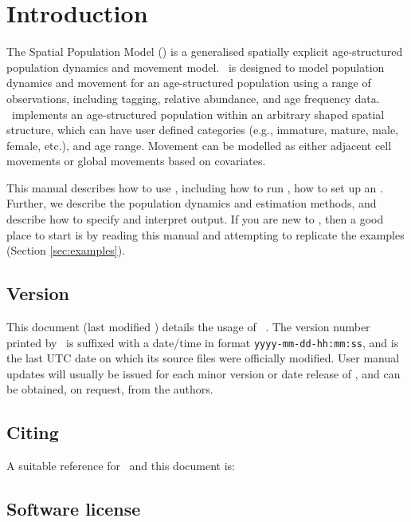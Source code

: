 \section{Introduction\label{sec:Introduction}}

The Spatial Population Model (\SPM) is a generalised spatially explicit age-structured population dynamics and movement model. \SPM\ is designed to model population dynamics and movement for an age-structured population using a range of observations, including tagging, relative abundance, and age frequency data. \SPM\ implements an age-structured population within an arbitrary shaped spatial structure, which can have user defined categories (e.g., immature, mature, male, female, etc.), and age range. Movement can be modelled as either adjacent cell movements or global movements based on covariates.

This manual describes how to use \SPM, including how to run \SPM, how to set up an \config. Further, we describe the population dynamics and estimation methods, and describe how to specify and interpret output. If you are new to \SPM, then a good place to start is by reading this manual and attempting to replicate the examples (Section \ref{sec:examples}).

\subsection{Version\label{sec:version}}

This document (last modified \DocVer) details the usage of \SPM\ \VER. The version number printed by \SPM\ is suffixed with a date/time in format \texttt{yyyy-mm-dd-hh:mm:ss}, and is the last UTC date on which its source files were officially modified. User manual updates will usually be issued for each minor version or date release of \SPM, and can be obtained, on request, from the authors.

\subsection{Citing \SPM}

A suitable reference for \SPM\ and this document is:

\ManualRef{}

\subsection{Software license}

